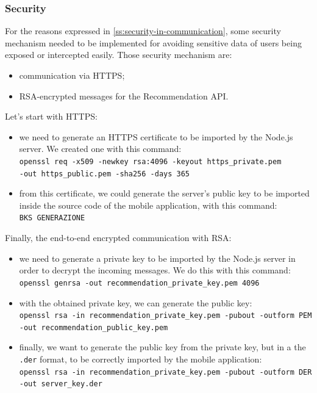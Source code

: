 \documentclass[../../main]{subfiles}
\begin{document}
\subsubsection{Security}
\label{sss:security}

For the reasons expressed in \ref{ss:security-in-communication}, some security mechanism needed to be implemented for avoiding sensitive data of users being exposed or intercepted easily.
Those security mechanism are:
\begin{itemize}
    \item communication via HTTPS;
    \item RSA-encrypted messages for the Recommendation API.
\end{itemize}
\noindent
Let's start with HTTPS:
\begin{itemize}
    \item we need to generate an HTTPS certificate to be imported by the Node.js server. We created one with this command:\\
    \texttt{openssl req -x509 -newkey rsa:4096 -keyout https\_private.pem}\\
    \texttt{-out https\_public.pem -sha256 -days 365}
    \item from this certificate, we could generate the server's public key to be imported inside the source code of the mobile application, with this command:\\
    \texttt{BKS GENERAZIONE}
\end{itemize}
\noindent
Finally, the end-to-end encrypted communication with RSA:
\begin{itemize}
    \item we need to generate a private key to be imported by the Node.js server in order to decrypt the incoming messages. We do this with this command:\\
    \texttt{openssl genrsa -out recommendation\_private\_key.pem 4096}
    \item with the obtained private key, we can generate the public key:\\
    \texttt{openssl rsa -in recommendation\_private\_key.pem -pubout -outform PEM}\\
    \texttt{-out recommendation\_public\_key.pem}
    \item finally, we want to generate the public key from the private key, but in a the \texttt{.der} format, to be correctly imported by the mobile application:\\
    \texttt{openssl rsa -in recommendation\_private\_key.pem -pubout -outform DER}\\
    \texttt{-out server\_key.der}
\end{itemize}
\end{document}
